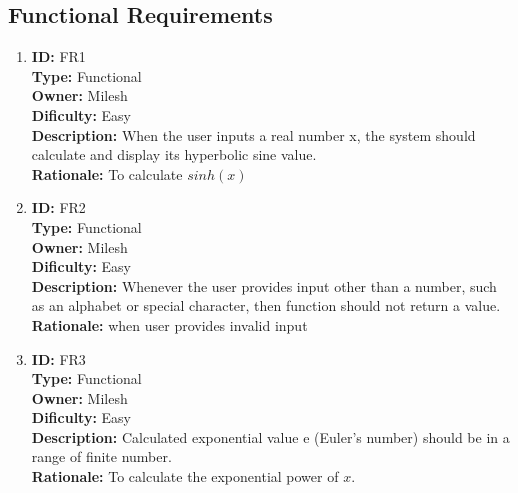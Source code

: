 \documentclass[
	12pt
]{article}
\begin{document}
\subsection{Functional Requirements}
\begin{enumerate}
\item\textbf{ID:} FR1\\
    \textbf{Type:} Functional\\
    \textbf{Owner:} Milesh\\
    \textbf{Dificulty:}  Easy\\
    \textbf{Description:} When the user inputs a real number x, the system should calculate and display its hyperbolic sine value.\\
    \textbf{Rationale:} To calculate $sinh(x)$
    
    \item\textbf{ID:} FR2\\
    \textbf{Type:} Functional\\
    \textbf{Owner:} Milesh\\
    \textbf{Dificulty:}  Easy\\
    \textbf{Description:} Whenever the user provides input other than a number, such as an alphabet or special character, then function should not return a value.\\
    \textbf{Rationale:} when user provides invalid input
    
\item\textbf{ID:} FR3\\
    \textbf{Type:} Functional\\
    \textbf{Owner:} Milesh\\
    \textbf{Dificulty:}  Easy\\
    \textbf{Description:} Calculated exponential value e (Euler's number)\cite{singintro1} should be in a range of finite number.\\
    \textbf{Rationale:} To calculate the exponential power of $x$.
    
\end{enumerate}
\end{document}
